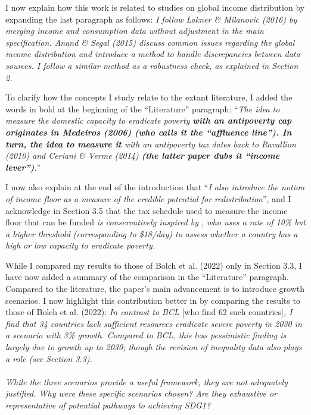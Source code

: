 \documentclass[12pt,english]{article}
\begin{document}
I now explain how this work is related to studies on global income distribution by expanding the last paragraph as follows: 
\textit{I follow Lakner \& Milanovic (2016) by merging income and consumption data without adjustment in the main specification. 
Anand \& Segal (2015) discuss common issues regarding the global income distribution and introduce a method to handle discrepancies between data sources. I follow a similar method as a robustness check, as explained in Section 2.} 

To clarify how the concepts I study relate to the extant literature, I added the words in bold at the beginning of the ``Literature'' paragraph: ``\textit{The idea to measure the domestic capacity to eradicate poverty \textbf{with an antipoverty cap originates in Medeiros (2006) (who calls it the ``affluence line''). In turn, the idea to measure it} with an antipoverty tax dates back to Ravallion (2010) and Ceriani \& Verme (2014) \textbf{(the latter paper dubs it ``income lever'')}.}''

I now also explain at the end of the introduction that ``\textit{I also introduce the notion of \textit{income floor} as a measure of the credible potential for redistribution}'', and I acknowledge in Section 3.5 that the tax schedule used to measure the income floor that can be funded \textit{is conservatively inspired by \cite{ravallion_poorer_2010}, who uses a rate of 10\% but a higher threshold (corresponding to \$18/day) to assess whether a country has a high or low capacity to eradicate poverty.}

While I compared my results to those of Bolch et al. (2022) only in Section 3.3, I have now added a summary of the comparison in the ``Literature'' paragraph. 
Compared to the literature, the paper's main advancement is to introduce growth scenarios. I now highlight this contribution better in by comparing the results to those of Bolch et al. (2022): 
\textit{In contrast to BCL} [who find 62 such countries]\textit{, I find that 34 countries lack sufficient resources eradicate severe poverty in 2030 in a scenario with 3\% growth. Compared to BCL, this less pessimistic finding is largely due to growth up to 2030; though the revision of inequality data also plays a role (see Section 3.3). }
~\\ ~\\

\textit{While the three scenarios provide a useful framework, they are not adequately justified. Why were these specific scenarios chosen? Are they exhaustive or representative of potential pathways to achieving SDG1? }~\\
\end{document}
